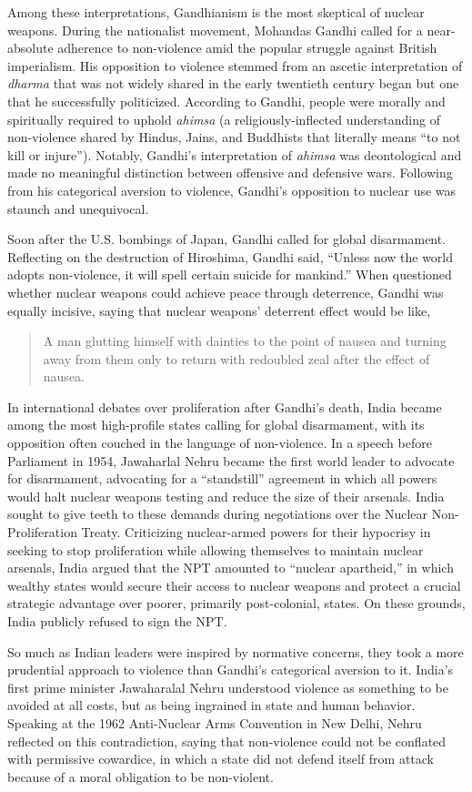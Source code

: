 \documentclass[12pt]{article}
\begin{document}
Among these interpretations, Gandhianism is the most skeptical of nuclear weapons. During the nationalist movement, Mohandas Gandhi called for a near-absolute adherence to non-violence amid the popular struggle against British imperialism. His opposition to  violence stemmed from an ascetic interpretation of \textit{dharma} that was not widely shared in the early twentieth century began but one that he successfully politicized. According to Gandhi, people were morally and spiritually required to uphold \textit{ahimsa} (a religiously-inflected understanding of non-violence shared by Hindus, Jains, and Buddhists that literally means “to not kill or injure”). Notably, Gandhi's interpretation of \textit{ahimsa} was deontological and made no meaningful distinction between offensive and defensive wars. Following from his categorical aversion to violence, Gandhi's opposition to nuclear use was staunch and unequivocal.

Soon after the U.S. bombings of Japan, Gandhi called for global disarmament. Reflecting on the destruction of Hiroshima, Gandhi said, “Unless now the world adopts non-violence, it will spell certain suicide for mankind.” When questioned whether nuclear weapons could achieve peace through deterrence, Gandhi was equally incisive, saying that nuclear weapons' deterrent effect would be like, \blockquote{A man glutting himself with dainties to the point of nausea and turning away from them only to return with redoubled zeal after the effect of nausea.}

In international debates over proliferation after Gandhi's death, India became among the most high-profile states calling for global disarmament, with its opposition often couched in the language of non-violence. In a speech before Parliament in 1954, Jawaharlal Nehru became the first world leader to advocate for disarmament, advocating for a “standstill” agreement in which all powers would halt nuclear weapons testing and reduce the size of their arsenals. India sought to give teeth to these demands during negotiations over the Nuclear Non-Proliferation Treaty. Criticizing nuclear-armed powers for their hypocrisy in seeking to stop proliferation while allowing themselves to maintain nuclear arsenals, India argued that the NPT amounted to “nuclear apartheid,” in which wealthy states would secure their access to nuclear weapons and protect a crucial strategic advantage over poorer, primarily post-colonial, states. On these grounds, India publicly refused to sign the NPT.

So much as Indian leaders were  inspired by normative concerns, they took a more prudential approach to violence than Gandhi's categorical aversion to it. India's first prime minister Jawaharalal Nehru understood violence as something to be avoided at all costs, but as being ingrained in state and human behavior. Speaking at the 1962 Anti-Nuclear Arms Convention in New Delhi, Nehru reflected on this contradiction, saying that non-violence could not be conflated with permissive cowardice, in which a state did not defend itself from attack because of a moral obligation to be non-violent.
\end{document}
